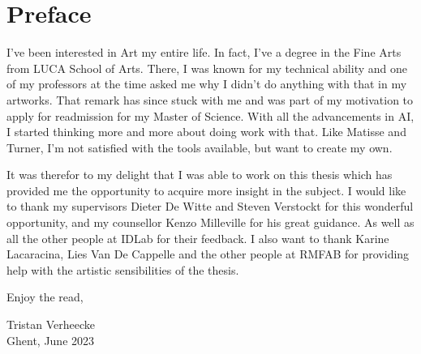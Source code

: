 \chapter*{Preface}

I've been interested in Art my entire life. In fact, I've a degree in the Fine Arts from LUCA School of Arts.
There, I was known for my technical ability and one of my professors at the time asked me why I didn't do anything with that in my artworks.
That remark has since stuck with me and was part of my motivation to apply for readmission for my Master of Science.
With all the advancements in AI, I started thinking more and more about doing work with that.
Like Matisse and Turner, I'm not satisfied with the tools available, but want to create my own.

It was therefor to my delight that I was able to work on this thesis which has provided me the opportunity to acquire more insight in the subject.
I would like to thank my supervisors Dieter De Witte and Steven Verstockt for this wonderful opportunity,
and my counsellor Kenzo Milleville for his great guidance. As well as all the other people at IDLab for their feedback.
I also want to thank Karine Lacaracina, Lies Van De Cappelle and the other people at RMFAB for providing help with the artistic sensibilities of the thesis.

Enjoy the read,

Tristan Verheecke\\
Ghent, June 2023